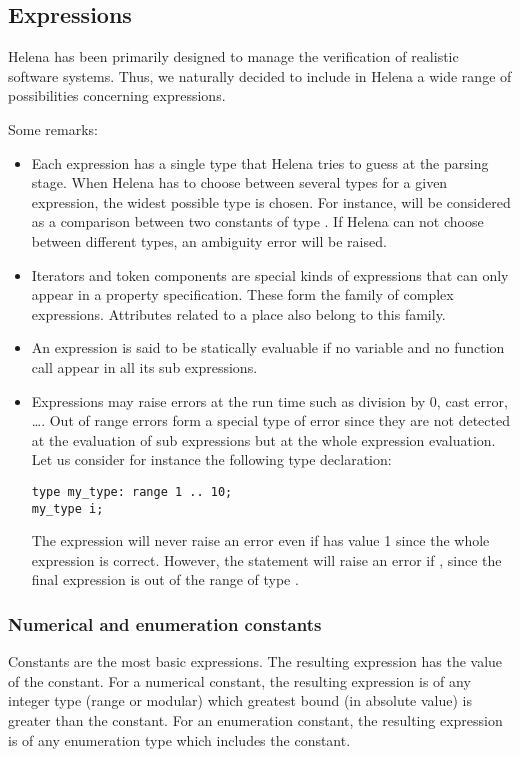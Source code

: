 \subsection{Expressions}\label{subsection_expressions}
Helena has been primarily designed to manage the verification of
realistic software systems.  Thus, we naturally decided to include in
Helena a wide range of possibilities concerning expressions.

Some remarks:
\begin{itemize}
\item Each expression has a single type that Helena tries to guess at
  the parsing stage.  When Helena has to choose between several types
  for a given expression, the widest possible type is chosen.  For
  instance,  will be considered as a comparison between two
  constants of type .  If Helena can not choose between
  different types, an ambiguity error will be raised.
\item Iterators and token components are special kinds of expressions
  that can only appear in a property specification.  These form the
  family of complex expressions.  Attributes related to a place also
  belong to this family.
\item An expression is said to be statically evaluable if no variable
  and no function call appear in all its sub expressions.
\item Expressions may raise errors at the run time such as division by
  0, cast error, \dots.  Out of range errors form a special type of
  error since they are not detected at the evaluation of sub
  expressions but at the whole expression evaluation.  Let us consider
  for instance the following type declaration:
\begin{lstlisting}
type my_type: range 1 .. 10;
my_type i;
\end{lstlisting}
The expression  will never raise an error even if 
has value 1 since the whole expression is correct.  However, the
statement  will raise an error if , since the
final expression is out of the range of type .
\end{itemize}

\expressiondef


\subsubsection{Numerical and enumeration constants}
Constants are the most basic expressions.  The resulting expression
has the value of the constant.  For a numerical constant, the
resulting expression is of any integer type (range or modular) which
greatest bound (in absolute value) is greater than the constant.  For
an enumeration constant, the resulting expression is of any
enumeration type which includes the constant.\\

